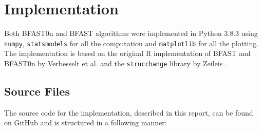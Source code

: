 \documentclass[main.tex]{subfiles}
\begin{document}
\chapter{Implementation}
\label{chap:implementation}
Both BFAST0n and BFAST algorithms were implemented in Python 3.8.3 using
\texttt{numpy}, \texttt{statsmodels}\cite{statsmodels} for all the computation
and \texttt{matplotlib} for all the plotting. The implementation is based on the
original R implementation of BFAST and BFAST0n by Verbesselt et al.
\cite{bfast-github} and the \texttt{strucchange} library by Zeileis
\cite{strucchange_code}.

\section{Source Files}
\label{sec:source_files}
The source code for the implementation, described in this report, can be found
on GitHub \cite{my-github} and is structured in a following manner:
\end{document}

